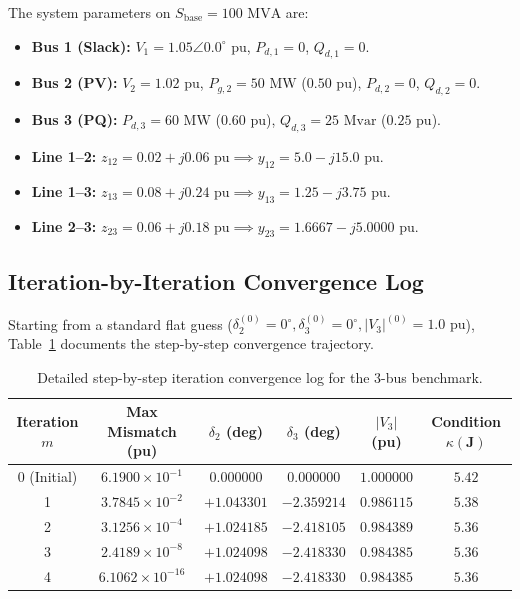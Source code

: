 \documentclass[12pt,a4paper,oneside]{report}
\begin{document}
The system parameters on $S_{\text{base}} = 100\text{ MVA}$ are:
\begin{itemize}
    \item \textbf{Bus 1 (Slack):} $V_1 = 1.05\angle 0.0^\circ\text{ pu}$, $P_{d,1} = 0$, $Q_{d,1} = 0$.
    \item \textbf{Bus 2 (PV):} $V_2 = 1.02\text{ pu}$, $P_{g,2} = 50\text{ MW}$ ($0.50\text{ pu}$), $P_{d,2} = 0$, $Q_{d,2} = 0$.
    \item \textbf{Bus 3 (PQ):} $P_{d,3} = 60\text{ MW}$ ($0.60\text{ pu}$), $Q_{d,3} = 25\text{ Mvar}$ ($0.25\text{ pu}$).
    \item \textbf{Line 1--2:} $z_{12} = 0.02 + j0.06\text{ pu} \implies y_{12} = 5.0 - j15.0\text{ pu}$.
    \item \textbf{Line 1--3:} $z_{13} = 0.08 + j0.24\text{ pu} \implies y_{13} = 1.25 - j3.75\text{ pu}$.
    \item \textbf{Line 2--3:} $z_{23} = 0.06 + j0.18\text{ pu} \implies y_{23} = 1.6667 - j5.0000\text{ pu}$.
\end{itemize}

\subsection{Iteration-by-Iteration Convergence Log}
Starting from a standard flat guess ($\delta_2^{(0)} = 0^\circ, \delta_3^{(0)} = 0^\circ, |V_3|^{(0)} = 1.0\text{ pu}$), Table~\ref{tab:3bus_iter} documents the step-by-step convergence trajectory.

\begin{table}[htbp]
\centering
\caption{Detailed step-by-step iteration convergence log for the 3-bus benchmark.}
\label{tab:3bus_iter}
\small
\begin{tabular}{cccccc}
\toprule
\textbf{Iteration $m$} & \textbf{Max Mismatch (pu)} & $\delta_2$ (deg) & $\delta_3$ (deg) & $|V_3|$ (pu) & \textbf{Condition $\kappa(\mathbf{J})$} \\
\midrule
0 (Initial) & $6.1900 \times 10^{-1}$ & $0.000000$ & $0.000000$ & $1.000000$ & $5.42$ \\
1 & $3.7845 \times 10^{-2}$ & $+1.043301$ & $-2.359214$ & $0.986115$ & $5.38$ \\
2 & $3.1256 \times 10^{-4}$ & $+1.024185$ & $-2.418105$ & $0.984389$ & $5.36$ \\
3 & $2.4189 \times 10^{-8}$ & $+1.024098$ & $-2.418330$ & $0.984385$ & $5.36$ \\
4 & $6.1062 \times 10^{-16}$ & $+1.024098$ & $-2.418330$ & $0.984385$ & $5.36$ \\
\bottomrule
\end{tabular}
\end{table}
\end{document}
